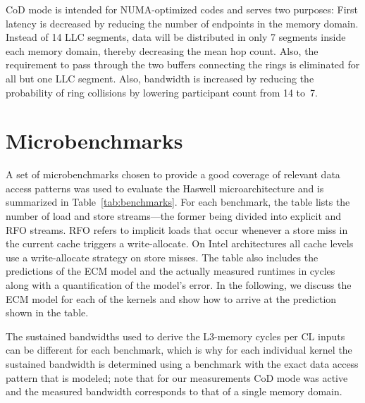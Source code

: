 \documentclass{llncs}
\begin{document}
\ac{CoD} mode is intended for NUMA-optimized codes and serves two purposes:
First latency is decreased  by reducing the number of endpoints in the memory
domain. Instead of 14 LLC segments, data will be distributed in only 7 segments
inside each memory domain, thereby decreasing the mean hop count.  Also, the
requirement to pass through the two buffers connecting the rings is eliminated
for all but one \ac{LLC} segment.  Also, bandwidth is increased by reducing the
probability of ring collisions by lowering participant count from 14 to~7.

\section{Microbenchmarks}
\label{sec:microbenchmarks}

A set of microbenchmarks chosen to provide a good coverage of relevant data
access patterns was used to evaluate the Haswell microarchitecture and is
summarized in Table~\ref{tab:benchmarks}.  For each benchmark, the table lists
the number of load and store streams---the former being divided into explicit
and \ac{RFO} streams. \ac{RFO} refers to implicit loads that occur whenever a
store miss in the current cache triggers a write-allocate. On Intel
architectures all cache levels use a write-allocate strategy on store misses.
The table also includes the predictions of the ECM model and the actually
measured runtimes in cycles along with a quantification of the model's error.
In the following, we discuss the ECM model for each of the kernels and show how
to arrive at the prediction shown in the table.

The sustained bandwidths used to derive the L3-memory cycles per \ac{CL} inputs
can be different for each benchmark, which is why for each individual kernel
the sustained bandwidth is determined using a benchmark with the exact data
access pattern that is modeled; note that for our measurements \ac{CoD} mode
was active and the measured bandwidth corresponds to that of a single memory
domain.
\end{document}
